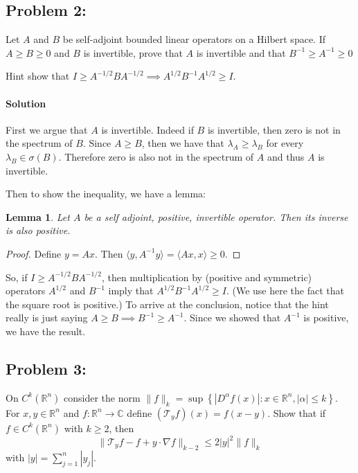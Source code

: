 \documentclass[letterpaper,twoside,11pt]{article}
\theoremstyle{mystyle}
\newtheorem{lemma}[theorem]{Lemma}
\newcommand{\R}{{\mathbb R}}
\newcommand{\C}{{\mathbb C}}
\begin{document}
\newpage \subsection*{Problem 2:}
Let $A$ and $B$ be self-adjoint bounded linear operators on a Hilbert space. If $A\geq B \geq 0$ and $B$ is invertible, prove that $A$ is invertible and that $B^{-1}\geq A^{-1} \geq 0$ 

Hint show that $I\geq A^{-1/2}BA^{-1/2}\implies A^{1/2}B^{-1}A^{1/2}\geq I$.

\paragraph*{Solution} First we argue that $A$ is invertible. Indeed if $B$ is invertible, then zero is not in the spectrum of $B$. Since $A\geq B$, then we have that $\lambda_A \geq \lambda_B$ for every $\lambda_B\in\sigma(B)$. Therefore zero is also not in the spectrum of $A$ and thus $A$ is invertible. 

Then to show the inequality, we have a lemma: 
\begin{lemma}
  Let $A$ be a self adjoint, positive, invertible operator. Then its inverse is also positive. 
\end{lemma}
\begin{proof}
  Define $y = Ax$. Then $\langle y, A^{-1} y\rangle = \langle Ax, x\rangle \geq 0$. 
\end{proof}
So, if $I \geq A^{-1/2}BA^{-1/2}$, then multiplication by (positive and symmetric) operators $A^{1/2}$ and $B^{-1}$ imply that $A^{1/2}B^{-1}A^{1/2}\geq I$. (We use here the fact that the square root is positive.) To arrive at the conclusion, notice that the hint really is just saying $A\geq B \implies B^{-1}\geq A^{-1}$. Since we showed that $A^{-1}$ is positive, we have the result. 

\subsection*{Problem 3:}
On $C^k(\R^n)$ consider the norm $\|f\|_k = \sup\left\{ |D^\alpha f(x) | : x\in \R^n, |\alpha|\leq k \right\}$. For $x, y\in \R^n$ and $f: \R^n \to \C$ define $(\mathcal T_y f)(x)= f(x-y)$. Show that if $f\in C^k(\R^n)$ with $k\geq 2$, then 
\[\|\mathcal T_y f - f + y\cdot \nabla f\|_{k-2} \leq 2|y|^2 \|f\|_k\] with $|y| = \sum_{j=1}^n |y_j|$.
\end{document}
